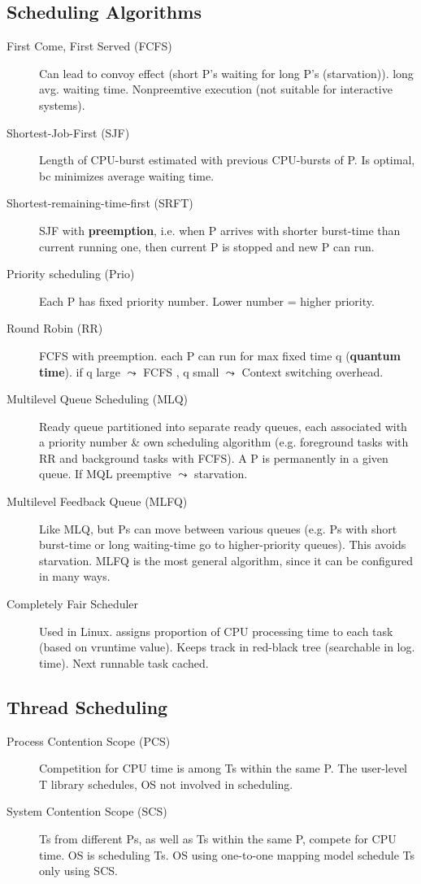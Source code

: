 \subsection*{Scheduling Algorithms} %
\begin{description}
  \item[First Come, First Served (FCFS)] Can lead to convoy effect (short P's waiting for long P's (starvation)). long avg. waiting time. Nonpreemtive execution (not suitable for interactive systems).
  \item[Shortest-Job-First (SJF)] Length of CPU-burst estimated with previous CPU-bursts of P. Is optimal, bc minimizes average waiting time.
  \item[Shortest-remaining-time-first (SRFT)] SJF with \textbf{preemption}, i.e. when P arrives with shorter burst-time than current running one, then current P is stopped and new P can run.
  \item[Priority scheduling (Prio)] Each P has fixed priority number. Lower number = higher priority. %
  \item[Round Robin (RR)] FCFS with preemption. each P can run for max fixed time q (\textbf{quantum time}). if q large $\leadsto$ FCFS , q small $\leadsto$ Context switching overhead.
  \item[Multilevel Queue Scheduling (MLQ)] Ready queue partitioned into separate ready queues, each associated with a priority number \& own scheduling algorithm (e.g. foreground tasks with RR and background tasks with FCFS). A P is permanently in a given queue. If MQL preemptive $\leadsto$ starvation. %
  \item[Multilevel Feedback Queue (MLFQ)] Like MLQ, but Ps can move between various queues (e.g. Ps with short burst-time or long waiting-time go to higher-priority queues). This avoids starvation. MLFQ is the most general algorithm, since it can be configured in many ways.
\item[Completely Fair Scheduler]Used in Linux. assigns proportion of CPU processing time to each task (based on vruntime value). Keeps track in red-black tree (searchable in log. time). Next runnable task cached.
\end{description}

\subsection*{Thread Scheduling}
\begin{description}
  \item[Process Contention Scope (PCS)] Competition for CPU time is among Ts within the same P. The user-level T library schedules, OS not involved in scheduling.
  \item[System Contention Scope (SCS)] Ts from different Ps, as well as Ts within the same P, compete for CPU time. OS is scheduling Ts. OS using one-to-one mapping model schedule Ts only using SCS.
\end{description}

